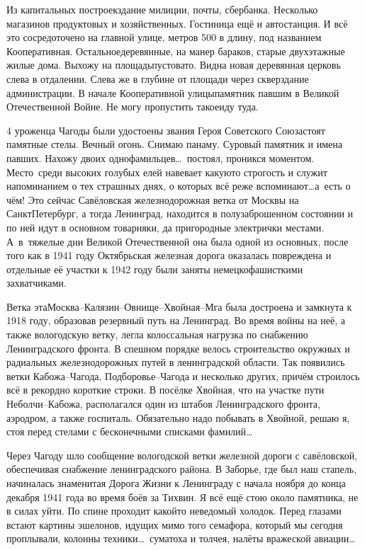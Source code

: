 Из капитальных построек\mdash здание милиции, почты, сбербанка. Несколько магазинов продуктовых и хозяйственных. Гостиница ещё и автостанция. И всё это сосредоточено на главной улице, метров 500 в длину, под названием Кооперативная. Остальное\mdash деревянные, на манер бараков, старые двухэтажные жилые дома. Выхожу на площадь\mdash пустовато. Видна новая деревянная церковь слева в отдалении. Слева же в глубине от площади через сквер\mdash здание администрации. В начале Кооперативной улицы\mdash памятник павшим в Великой Отечественной Войне. Не могу пропустить такое\mdash иду туда. 

4 уроженца Чагоды были удостоены звания Героя Советского Союза\mdash стоят памятные стелы. Вечный огонь. Снимаю панаму. Суровый памятник и имена павших. Нахожу двоих однофамильцев\ldots~постоял, проникся моментом. Место~среди высоких голубых елей навевает какую\sdash то строгость и служит напоминанием о тех страшных днях, о которых всё реже вспоминают\ldots а~есть о чём! Это сейчас Савёловская железнодорожная ветка от Москвы на Санкт\sdash Петербург, а тогда Ленинград, находится в полузаброшенном состоянии и по ней идут в основном товарняки, да пригородные электрички местами. А~в~тяжелые дни Великой Отечественной она была одной из основных, после того как в 1941 году Октябрьская железная дорога оказалась повреждена и отдельные её участки к 1942 году были заняты немецко\sdash фашисткими захватчиками.

Ветка эта\mdash Москва\nobreakdash--Калязин\nobreakdash--Овнище\nobreakdash--Хвойная\nobreakdash--Мга была достроена и замкнута к 1918 году, образовав резервный путь на Ленинград. Во время войны на неё, а также вологодскую ветку, легла колоссальная нагрузка по снабжению Ленинградского фронта. В спешном порядке велось строительство окружных и радиальных железнодорожных путей в ленинградской области. Так появились ветки Кабожа\nobreakdash--Чагода, Подборовье\nobreakdash--Чагода и несколько других, причём строилось всё в рекордно короткие строки. В посёлке Хвойная, что на участке пути Неболчи\nobreakdash--Кабожа, располагался один из штабов Ленинградского фронта, аэродром, а также госпиталь. Обязательно надо побывать в Хвойной, решаю я, стоя перед стелами с бесконечными списками фамилий…

Через Чагоду шло сообщение вологодской ветки железной дороги с савёловской, обеспечивая снабжение ленинградского района. В Заборье, где был наш стапель, начиналась знаменитая Дорога Жизни к Ленинграду с начала ноября до конца декабря 1941 года во время боёв за Тихвин. Я всё ещё стою около памятника, не в силах уйти. По спине проходит какой\sdash то неведомый холодок. Перед глазами встают картины эшелонов, идущих мимо того семафора, который мы сегодня проплывали, колонны техники\ldots~суматоха и толчея, налёты вражеской авиации\ldots~  

